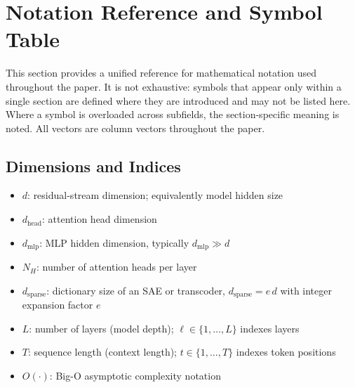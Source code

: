 \section{Notation Reference and Symbol Table}
\label{app:notation}
This section provides a unified reference for mathematical notation used
throughout the paper. It is not exhaustive: symbols that appear only
within a single section are defined where they are introduced and may not be
listed here. Where a symbol is overloaded across subfields, the
section-specific meaning is noted. All vectors are column vectors throughout the paper.

\subsection{Dimensions and Indices}
\begin{itemize}
    \item $d$: residual-stream dimension; equivalently model hidden size
    \item $d_{\text{head}}$: attention head dimension
    \item $d_{\text{mlp}}$: MLP hidden dimension, typically $d_{\text{mlp}} \gg d$
    \item $N_H$: number of attention heads per layer
    \item $d_{\text{sparse}}$: dictionary size of an SAE or transcoder,
          $d_{\text{sparse}} = e\,d$ with integer expansion factor $e$
    \item $L$: number of layers (model depth); $\ell \in \{1,\dots,L\}$ indexes layers
    \item $T$: sequence length (context length); $t \in \{1,\dots,T\}$ indexes token positions
    \item $O(\cdot)$: Big-O asymptotic complexity notation
\end{itemize}

